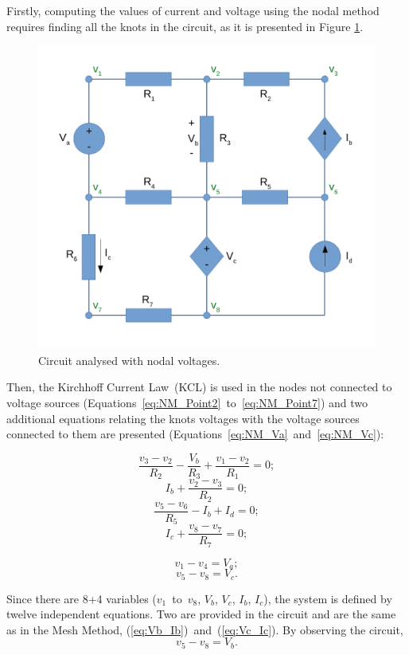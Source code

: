 Firstly, computing the values of current and voltage using the nodal method requires finding all the knots in the circuit, as it is presented in Figure \ref{fig:Circuit_Nodal}.

\begin{figure}[h] \centering
\includegraphics[width=0.5\linewidth]{CircuitNodal.pdf}
\caption{Circuit analysed with nodal voltages.}
\label{fig:Circuit_Nodal}
\end{figure}

Then, the Kirchhoff Current Law~(KCL) is used in the nodes not connected to voltage sources (Equations~\ref{eq:NM_Point2}~to~\ref{eq:NM_Point7}) and two additional equations relating the knots voltages with the voltage sources connected to them are presented (Equations~\ref{eq:NM_Va}~and~\ref{eq:NM_Vc}):

\begin{equation}
  \frac{v_3-v_2}{R_2} - \frac{V_b}{R_3} + \frac{v_1-v_2}{R_1} = 0;
  \label{eq:NM_Point2}
\end{equation}
\begin{equation}
  I_b + \frac{v_2-v_3}{R_2} = 0;	
  \label{eq:NM_Point3}
\end{equation}
\begin{equation}
  \frac{v_5-v_6}{R_5} - I_b + I_d = 0;
  \label{eq:NM_Point6}
\end{equation}
\begin{equation}
  I_c + \frac{v_8-v_7}{R_7} = 0;
  \label{eq:NM_Point7}
\end{equation}

\begin{equation}
  v_1 - v_4 = V_a;
  \label{eq:NM_Va}
\end{equation}
\begin{equation}
  v_5 - v_8 = V_c.
  \label{eq:NM_Vc}
\end{equation}

Since there are 8+4 variables ($v_1$~to~$v_8$, $V_b$, $V_c$, $I_b$, $I_c$), the system is defined by twelve independent equations. Two are provided in the circuit and are the same as in the Mesh Method, (\ref{eq:Vb_Ib})~and~(\ref{eq:Vc_Ic}).
By observing the circuit,
\begin{equation}
  v_5 - v_8 = V_b.
  \label{eq:NM_Vb}
\end{equation}

